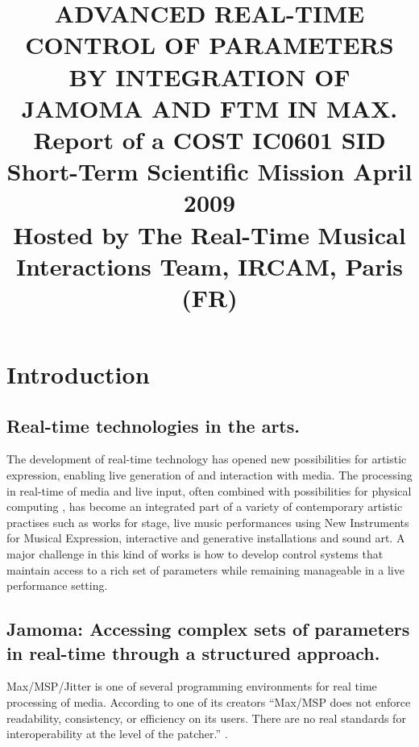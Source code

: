 \documentclass{article}
\title{ADVANCED REAL-TIME CONTROL OF PARAMETERS \\BY INTEGRATION OF JAMOMA AND FTM IN MAX.\\
Report of a COST IC0601 SID Short-Term Scientific Mission April 2009 \\Hosted by The Real-Time Musical Interactions Team, IRCAM, Paris (FR)}
\begin{document}
%    
\sloppy
\maketitle
%

\permission

\begin{abstract}  



\end{abstract}

\section{Introduction}\label{sec:introduction}        


\subsection{Real-time technologies in the arts.}\label{sec:intro-real-time}

The development of real-time technology has opened new possibilities for artistic expression, enabling live generation of and interaction with media. The processing in real-time of media and live input, often combined with possibilities for physical computing \cite{Sullivan_2004_physical_computing}, has become an integrated part of a variety of contemporary artistic practises such as works for stage, live music performances using New Instruments for Musical Expression, interactive and generative installations and sound art. A major challenge in this kind of works is how to develop control systems that maintain access to a rich set of parameters while remaining manageable in a live performance setting.

\subsection{Jamoma: Accessing complex sets of parameters in real-time through a structured approach.}\label{sec:intro-accessing}

Max/MSP/Jitter is one of several programming environments for real time processing of media. According to one of its creators ``Max/MSP does not enforce readability, consistency, or efficiency on its users. There are no real standards for interoperability at the level of the patcher.'' \cite{Zicarelli:2002_program_that_do_nothing}.
\end{document}
